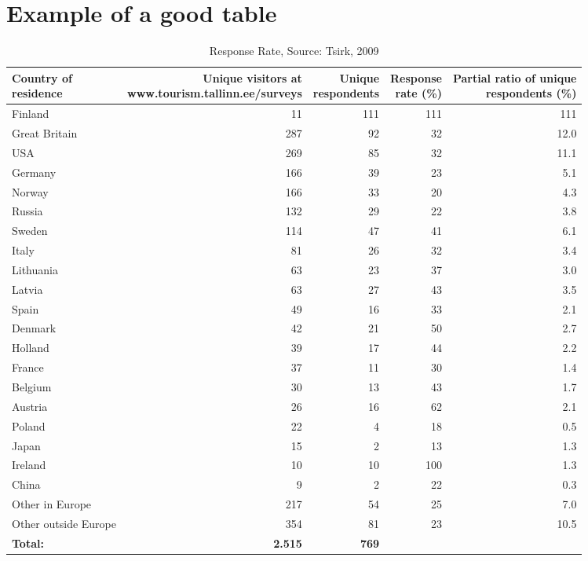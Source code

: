 \section{Example of a good table}
\label{sec:tableexample}


\begin{table*}[h]
	\centering
	\footnotesize 
\begin{tabular}{@{}lrrrr@{}}
	\hline
	\specialcell{Country of \\ residence} & 
	\specialcell{Unique visitors at\\  www.tourism.tallinn.ee/surveys} & 
	\specialcell{Unique \\ respondents} &
	\specialcell{Response \\ rate (\%)} &
	\specialcell{Partial ratio of unique \\respondents (\%)}\\
    \midrule	 
	Finland & 11 & 111 & 111 & 111 \\
	Great Britain & 287 & 92 & 32 & 12.0\\
	USA & 269 & 85 & 32 & 11.1\\
	Germany & 166 &	39 & 23 & 5.1\\
	Norway & 166 & 33 & 20 & 4.3\\
	Russia & 132 & 29 & 22 & 3.8\\
	Sweden & 114 & 47 & 41 & 6.1\\
	Italy & 81 & 26 & 32 & 3.4\\
	Lithuania & 63 & 23 & 37 & 3.0\\
	Latvia & 63 & 27 & 43 & 3.5\\
	Spain & 49 & 16 & 33 & 2.1\\
	Denmark & 42 & 21 & 50 & 2.7\\
	Holland & 39 & 17 & 44 & 2.2\\
	France & 37 & 11 & 30 & 1.4\\
	Belgium & 30 & 13 & 43 & 1.7\\
	Austria & 26 & 16 & 62 & 2.1\\
	Poland  & 22 & 4 & 18 & 0.5\\
	Japan & 15 & 2 & 13 & 1.3\\
	Ireland & 10 & 10 & 100 & 1.3\\
	China  & 9 & 2 & 22 & 0.3\\
	Other in Europe & 217 & 54 & 25 & 7.0\\
	Other outside Europe & 354 & 81 & 23 & 10.5\\
	\hline
	\textbf{Total:} & \textbf{2.515} & \textbf{769}  &   &  \\
	\bottomrule
\end{tabular}
\caption{Response Rate, Source: Tsirk, 2009} 
\end{table*}
	
